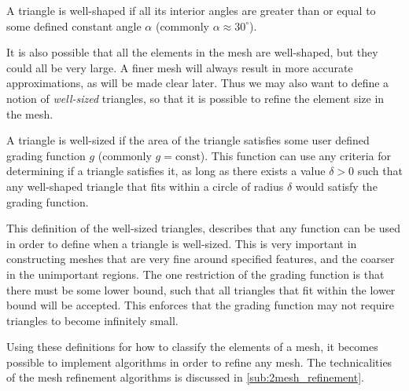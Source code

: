 \documentclass[../fem.tex]{subfile}
\begin{document}
\begin{definition}
  A triangle is well-shaped if all its interior angles are greater than or
  equal to some defined constant angle $\alpha$ (commonly
  $\alpha\approx30^\circ$).
\end{definition}

It is also possible that all the elements in the mesh are well-shaped, but they
could all be very large. A finer mesh will always result in more accurate
approximations, as will be made clear later. Thus we may also want to define a
notion of \textit{well-sized} triangles, so that it is possible to refine the
element size in the mesh.

\begin{definition}
  A triangle is well-sized if the area of the triangle satisfies some user
  defined grading function $g$ (commonly $g=\text{const}$). This function can
  use any criteria for determining if a triangle satisfies it, as long as there
  exists a value $\delta>0$ such that any well-shaped triangle that fits within
  a circle of radius $\delta$ would satisfy the grading function.
\end{definition}

This definition of the well-sized triangles, describes that any function can be
used in order to define when a triangle is well-sized. This is very important
in constructing meshes that are very fine around specified features, and the
coarser in the unimportant regions. The one restriction of the grading function
is that there must be some lower bound, such that all triangles that fit within
the lower bound will be accepted. This enforces that the grading function may
not require triangles to become infinitely small.

Using these definitions for how to classify the elements of a mesh, it becomes
possible to implement algorithms in order to refine any mesh. The
technicalities of the mesh refinement algorithms is discussed in
\ref{sub:2mesh_refinement}.
\end{document}
